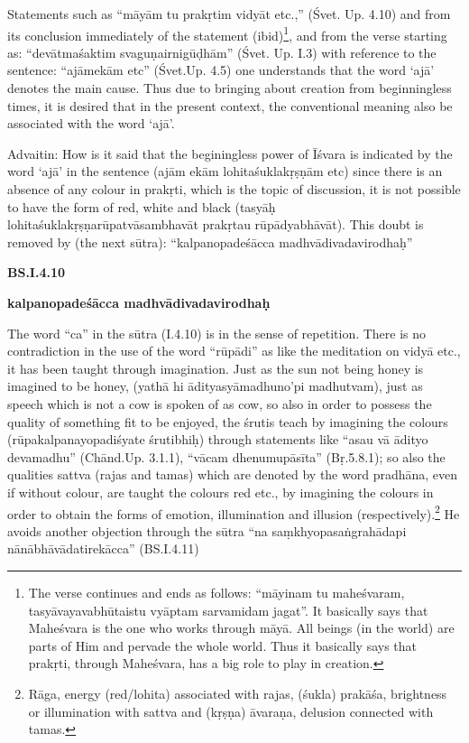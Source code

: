 Statements such as “māyām tu prakṛtim vidyāt etc.,” (Śvet. Up. 4.10) and from its conclusion immediately of the statement (ibid)\footnote{The verse continues and ends as  follows: “māyinam tu maheśvaram, tasyāvayavabhūtaistu vyāptam sarvamidam jagat”. It basically says that Maheśvara is the one who works through māyā. All beings (in the world) are parts of Him and pervade the whole world. Thus it basically says that prakṛti, through Maheśvara, has a big role to play in creation.}, and from the verse starting  as:  “devātmaśaktim svaguṇairnigūḍhām” (Śvet. Up. I.3) with reference to the sentence: “ajāmekām etc” (Śvet.Up. 4.5) one understands that the word ‘ajā’ denotes the main cause. Thus due to bringing about creation from beginningless times, it is desired that in the present context, the conventional meaning also be associated with the word ‘ajā’.

Advaitin: How is it said that the beginingless power of Īśvara is indicated by the word ‘ajā’ in the sentence (ajām  ekām lohitaśuklakṛṣṇām etc) since there is an absence of any colour in prakṛti, which is the topic of discussion, it is not possible to have the form of red, white and black (tasyāḥ lohitaśuklakṛṣṇarūpatvāsambhavāt prakṛtau rūpādyabhāvāt). This doubt is removed by (the next sūtra): “kalpanopadeśācca madhvādivadavirodhaḥ”

\textbf{}



\textbf{BS.I.4.10}

\textbf{kalpanopadeśācca madhvādivadavirodhaḥ}

The word “ca” in the sūtra (I.4.10) is in the sense of repetition. There is no contradiction in the use of the word “rūpādi” as like the meditation on vidyā etc., it has been taught through imagination. Just as the sun not being honey is  imagined to be  honey, (yathā hi ādityasyāmadhuno’pi madhutvam), just as speech which is not a cow is spoken of as cow, so also in order to possess the quality of something fit to be enjoyed, the śrutis teach by imagining the colours (rūpakalpanayopadiśyate śrutibhiḥ) through statements like “asau vā ādityo devamadhu” (Chānd.Up. 3.1.1), “vācam dhenumupāsīta” (Bṛ.5.8.1); so also the qualities sattva (rajas and tamas) which are denoted by the word pradhāna, even if without colour, are taught the colours red etc., by imagining the colours in order to obtain the forms of emotion, illumination and illusion (respectively).\footnote{Rāga,  energy (red/lohita) associated with rajas, (śukla) prakāśa, brightness or illumination with sattva and  (kṛṣṇa) āvaraṇa, delusion connected with tamas.} He avoids another objection through the sūtra “na saṃkhyopasaṅgrahādapi nānābhāvādatirekācca” (BS.I.4.11)

